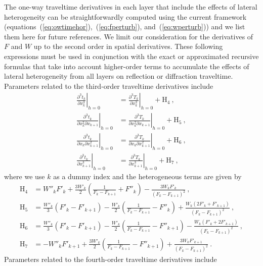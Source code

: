 The one-way traveltime derivatives in each layer that include the effects of lateral heterogeneity can be straightforwardly computed using the current framework (equations~(\ref{eq:owtimehor}),~(\ref{eq:fperturb}), and~(\ref{eq:wperturb})) and we list them here for future references. We limit our consideration for the derivatives of $F$ and $W$ up to the second order in spatial derivatives. These following expressions must be used in conjunction with the exact or approximated recursive formulas that take into account higher-order terms to accumulate the effects of lateral heterogeneity from all layers on reflection or diffraction traveltime. Parameters related to the third-order traveltime derivatives include
\begin{align}
\left. \frac{\partial^3 t_k }{\partial x_k^3}\right\rvert_{h=0} & =  \left. \frac{\partial^3 T_k }{\partial x_k^3}\right\rvert_{h=0} + \text{H}_4~,\\
\nonumber
\left. \frac{\partial^3 t_k }{\partial x_k^2 \partial x_{k+1}}\right\rvert_{h=0} & =  \left. \frac{\partial^3 T_k }{\partial x_k^2 \partial x_{k+1}}\right\rvert_{h=0} + \text{H}_5~,\\
\nonumber
\left. \frac{\partial^3 t_k }{\partial x_k \partial x_{k+1}^2}\right\rvert_{h=0} & =  \left. \frac{\partial^3 T_k }{\partial x_k \partial x_{k+1}^2}\right\rvert_{h=0} + \text{H}_6~,\\
\nonumber
\left. \frac{\partial^3 t_k }{\partial x_{k+1}^3}\right\rvert_{h=0} & =  \left. \frac{\partial^3 T_k }{\partial x_{k+1}^3}\right\rvert_{h=0} + \text{H}_7~,
\end{align}
where we use $k$ as a dummy index and the heterogeneous terms are given by
\begin{align}
\text{H}_4 & = W''_kF'_{k} + \frac{3W'_k}{2}\left(\frac{1}{F_k-F_{k+1}} + F''_{k} \right) - \frac{3 W_k F'_{k} }{(F_k-F_{k+1})^2} ~,\\
\nonumber
\text{H}_5 & = \frac{W''_k}{3} (F'_{k}- F'_{k+1}) - \frac{W'_k}{2} \left(\frac{1}{F_k-F_{k+1}} - F''_{k} \right) + \frac{ W_k (2F'_{k}+ F'_{k+1}) }{(F_k-F_{k+1})^2}~,\\
\nonumber
\text{H}_6 & = \frac{W''_k}{3} (F'_{k}- F'_{k+1}) - \frac{W'_k}{2} \left(\frac{1}{F_k-F_{k+1}} - F''_{k+1}\right) - \frac{ W_k (F'_{k}+ 2F'_{k+1}) }{(F_k-F_{k+1})^2}~,\\
\nonumber
\text{H}_7 & =  -W''_kF'_{k+1} + \frac{3W'_k}{2}\left(\frac{1}{F_k-F_{k+1}} - F''_{k+1} \right) + \frac{3 W_k F'_{k+1} }{(F_k-F_{k+1})^2} ~.
\end{align}
Parameters related to the fourth-order traveltime derivatives include
